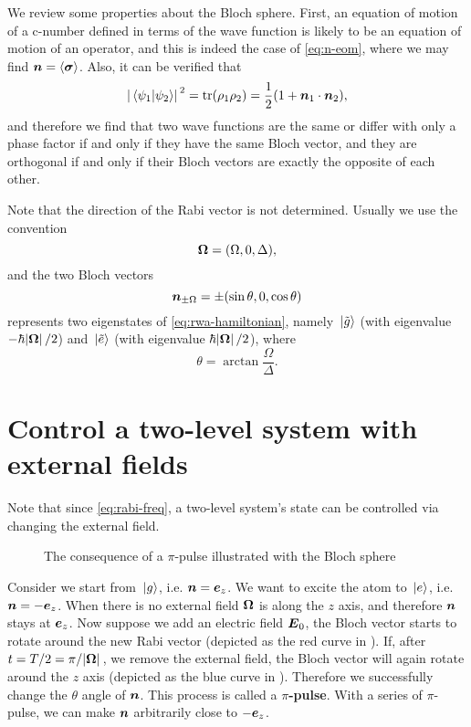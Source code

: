 \documentclass[hyperref, a4paper]{article}
\newcommand*{\concept}[1]{{\textbf{#1}}}
\begin{document}
We review some properties about the Bloch sphere.
First, an equation of motion of a c-number defined in terms of the wave function is likely to be an equation of motion of an operator, and this is indeed the case of \eqref{eq:n-eom}, where we may find $\vb*{n} = \expval{\vb*{\sigma}}$.
Also, it can be verified that 
\begin{equation}
    \abs*{\braket*{\psi_1}{\psi_2}}^2 = \trace(\rho_1 \rho_2) = \frac{1}{2} (1 + \vb*{n}_1 \cdot \vb*{n}_2),
\end{equation}
and therefore we find that two wave functions are the same or differ with only a phase factor if and only if they have the same Bloch vector, and they are orthogonal if and only if their Bloch vectors are exactly the opposite of each other.

Note that the direction of the Rabi vector is not determined.
Usually we use the convention
\begin{equation}
    \vb*{\Omega} = (\Omega, 0, \Delta), 
\end{equation} 
and the two Bloch vectors
\begin{equation}
    \vb*{n}_{\pm \Omega} = \pm (\sin \theta, 0, \cos \theta)
\end{equation}
represents two eigenstates of \eqref{eq:rwa-hamiltonian}, namely $\ket*{\tilde{g}}$ (with eigenvalue $- \hbar \abs*{\vb*{\Omega}} / 2$) and $\ket*{\tilde{e}}$ (with eigenvalue $\hbar \abs*{\vb*{\Omega}} / 2$), where 
\begin{equation}
    \theta = \arctan \frac{\Omega}{\Delta}.
\end{equation}

\section{Control a two-level system with external fields}

Note that since \eqref{eq:rabi-freq}, a two-level system's state can be controlled via changing the external field.

\begin{figure}
    \centering
    
    \caption{The consequence of a $\pi$-pulse illustrated with the Bloch sphere}
    \label{fig:pi-pulse-result}
\end{figure}

Consider we start from $\ket*{g}$, i.e. $\vb*{n} = \vb*{e}_z$.
We want to excite the atom to $\ket*{e}$, i.e. $\vb*{n} = - \vb*{e}_z$.
When there is no external field $\vb*{\Omega}$ is along the $z$ axis, and therefore $\vb*{n}$ stays at $\vb*{e}_z$. 
Now suppose we add an electric field $\vb*{E}_0$, the Bloch vector starts to rotate around the new Rabi vector (depicted as the red curve in ).
If, after $t = T/2 = \pi / \abs*{\vb*{\Omega}}$, we remove the external field, the Bloch vector will again rotate around the $z$ axis (depicted as the blue curve in ).
Therefore we successfully change the $\theta$ angle of $\vb*{n}$.
This process is called a \concept{$\pi$-pulse}.
With a series of $\pi$-pulse, we can make $\vb*{n}$ arbitrarily close to $- \vb*{e}_z$.
\end{document}
